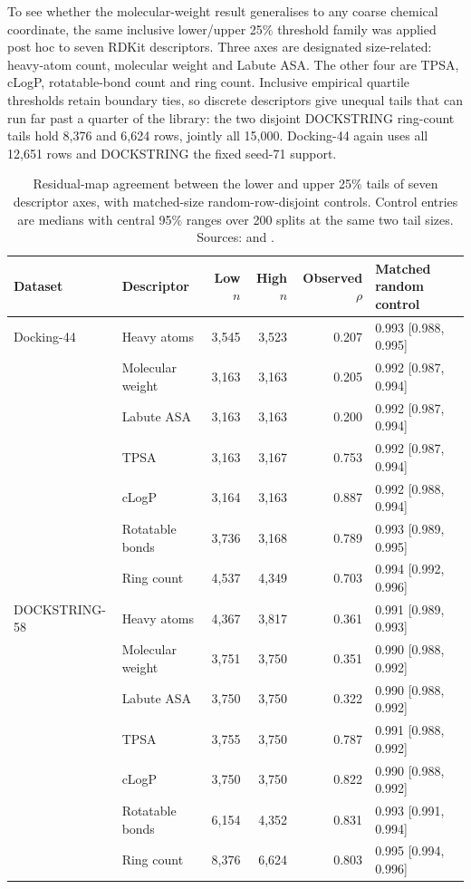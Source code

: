 
To see whether the molecular-weight result generalises to any coarse chemical coordinate, the
same inclusive lower/upper 25\% threshold family was applied post hoc to seven RDKit
descriptors. Three axes are designated size-related: heavy-atom count, molecular weight and
Labute ASA. The other four are TPSA, cLogP, rotatable-bond count and ring count. Inclusive
empirical quartile thresholds retain boundary ties, so discrete descriptors give unequal tails
that can run far past a quarter of the library: the two disjoint DOCKSTRING ring-count tails
hold 8{,}376 and 6{,}624 rows, jointly all 15{,}000. Docking-44 again uses all 12{,}651 rows
and DOCKSTRING the fixed seed-71 support.

\begin{table}[htbp]
\centering
\caption{Residual-map agreement between the lower and upper 25\% tails of seven descriptor
axes, with matched-size random-row-disjoint controls. Control entries are medians with central
95\% ranges over 200 splits at the same two tail sizes. Sources:
\protect{} and
\protect{}.}
\label{tab:s4descriptors}
\small
\begin{tabular}{llrrrl}
\toprule
Dataset & Descriptor & Low $n$ & High $n$ & Observed $\rho$ & Matched random control \\
\midrule
Docking-44 & Heavy atoms & 3{,}545 & 3{,}523 & 0.207 & 0.993 [0.988, 0.995] \\
 & Molecular weight & 3{,}163 & 3{,}163 & 0.205 & 0.992 [0.987, 0.994] \\
 & Labute ASA & 3{,}163 & 3{,}163 & 0.200 & 0.992 [0.987, 0.994] \\
 & TPSA & 3{,}163 & 3{,}167 & 0.753 & 0.992 [0.987, 0.994] \\
 & cLogP & 3{,}164 & 3{,}163 & 0.887 & 0.992 [0.988, 0.994] \\
 & Rotatable bonds & 3{,}736 & 3{,}168 & 0.789 & 0.993 [0.989, 0.995] \\
 & Ring count & 4{,}537 & 4{,}349 & 0.703 & 0.994 [0.992, 0.996] \\
\addlinespace
DOCKSTRING-58 & Heavy atoms & 4{,}367 & 3{,}817 & 0.361 & 0.991 [0.989, 0.993] \\
 & Molecular weight & 3{,}751 & 3{,}750 & 0.351 & 0.990 [0.988, 0.992] \\
 & Labute ASA & 3{,}750 & 3{,}750 & 0.322 & 0.990 [0.988, 0.992] \\
 & TPSA & 3{,}755 & 3{,}750 & 0.787 & 0.991 [0.988, 0.992] \\
 & cLogP & 3{,}750 & 3{,}750 & 0.822 & 0.990 [0.988, 0.992] \\
 & Rotatable bonds & 6{,}154 & 4{,}352 & 0.831 & 0.993 [0.991, 0.994] \\
 & Ring count & 8{,}376 & 6{,}624 & 0.803 & 0.995 [0.994, 0.996] \\
\bottomrule
\end{tabular}
\end{table}

